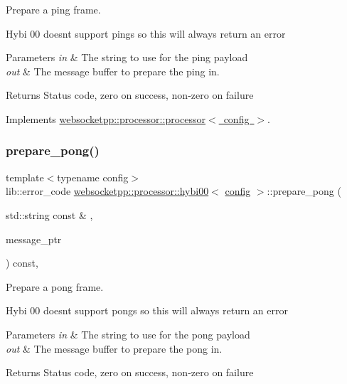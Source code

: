 Prepare a ping frame. 

Hybi 00 doesn\textquotesingle{}t support pings so this will always return an error


\begin{DoxyParams}{Parameters}
{\em in} & The string to use for the ping payload \\
\hline
{\em out} & The message buffer to prepare the ping in. \\
\hline
\end{DoxyParams}
\begin{DoxyReturn}{Returns}
Status code, zero on success, non-\/zero on failure 
\end{DoxyReturn}


Implements \mbox{\hyperlink{classwebsocketpp_1_1processor_1_1processor_aae3f34ae169c9b5e588cf268e310d6e2}{websocketpp\+::processor\+::processor$<$ config $>$}}.

\mbox{\label{classwebsocketpp_1_1processor_1_1hybi00_a1c9e4bf4f5b73e61bee7950c439a77db}} 
\subsubsection{\texorpdfstring{prepare\+\_\+pong()}{prepare\_pong()}}
{\footnotesize\ttfamily template$<$typename config$>$ \\
lib\+::error\+\_\+code \mbox{\hyperlink{classwebsocketpp_1_1processor_1_1hybi00}{websocketpp\+::processor\+::hybi00}}$<$ \mbox{\hyperlink{classconfig}{config}} $>$\+::prepare\+\_\+pong (\begin{DoxyParamCaption}\item[{std\+::string const \&}]{,  }\item[{message\+\_\+ptr}]{ }\end{DoxyParamCaption}) const\hspace{0.3cm}{\ttfamily [inline]}, {\ttfamily [virtual]}}



Prepare a pong frame. 

Hybi 00 doesn\textquotesingle{}t support pongs so this will always return an error


\begin{DoxyParams}{Parameters}
{\em in} & The string to use for the pong payload \\
\hline
{\em out} & The message buffer to prepare the pong in. \\
\hline
\end{DoxyParams}
\begin{DoxyReturn}{Returns}
Status code, zero on success, non-\/zero on failure 
\end{DoxyReturn}


